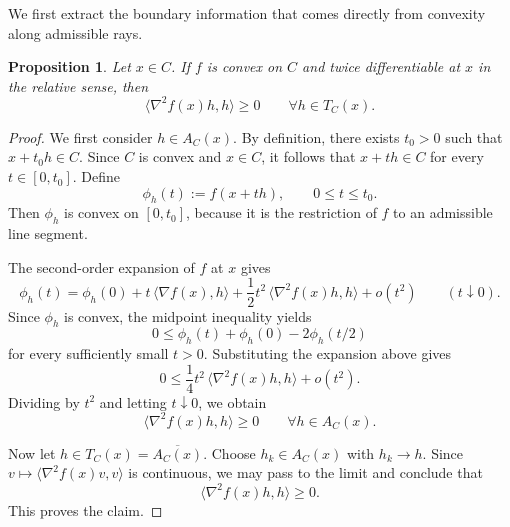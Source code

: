 \documentclass[reqno]{amsart}
\newtheorem{proposition}[theorem]{Proposition}
\theoremstyle{definition}
\newcommand{\inner}[2]{\langle #1,#2\rangle}
\begin{document}
We first extract the boundary information that comes directly from convexity
along admissible rays.

\begin{proposition}\label{prop:feasible-directions}
Let $x \in C$. If $f$ is convex on $C$ and twice differentiable at $x$ in the
relative sense, then
\begin{equation}
    \inner{\nabla^2 f(x)h}{h} \geq 0 \qquad \forall h \in T_C(x).
\end{equation}
\end{proposition}

\begin{proof}
We first consider $h \in A_C(x)$. By definition, there exists $t_0>0$ such that
$x+t_0 h \in C$. Since $C$ is convex and $x \in C$, it follows that
$x+t h \in C$ for every $t \in [0,t_0]$. Define
\begin{equation}
    \phi_h(t):=f(x+t h), \qquad 0 \leq t \leq t_0.
\end{equation}
Then $\phi_h$ is convex on $[0,t_0]$, because it is the restriction of $f$ to an
admissible line segment.

The second-order expansion of $f$ at $x$ gives
\begin{equation}
    \phi_h(t)=\phi_h(0)+t\,\inner{\nabla f(x)}{h}
    +\dfrac12 t^2\,\inner{\nabla^2 f(x)h}{h}+o(t^2)
    \qquad (t \downarrow 0).
\end{equation}
Since $\phi_h$ is convex, the midpoint inequality yields
\begin{equation}
    0 \leq \phi_h(t)+\phi_h(0)-2\phi_h(t/2)
\end{equation}
for every sufficiently small $t>0$. Substituting the expansion above gives
\begin{equation}
    0 \leq \dfrac14 t^2\,\inner{\nabla^2 f(x)h}{h}+o(t^2).
\end{equation}
Dividing by $t^2$ and letting $t \downarrow 0$, we obtain
\begin{equation}
    \inner{\nabla^2 f(x)h}{h} \geq 0 \qquad \forall h \in A_C(x).
\end{equation}

Now let $h \in T_C(x)=\overline{A_C(x)}$. Choose $h_k \in A_C(x)$ with
$h_k \to h$. Since $v \mapsto \inner{\nabla^2 f(x)v}{v}$ is continuous, we may
pass to the limit and conclude that
\begin{equation}
    \inner{\nabla^2 f(x)h}{h} \geq 0.
\end{equation}
This proves the claim.
\end{proof}
\end{document}
